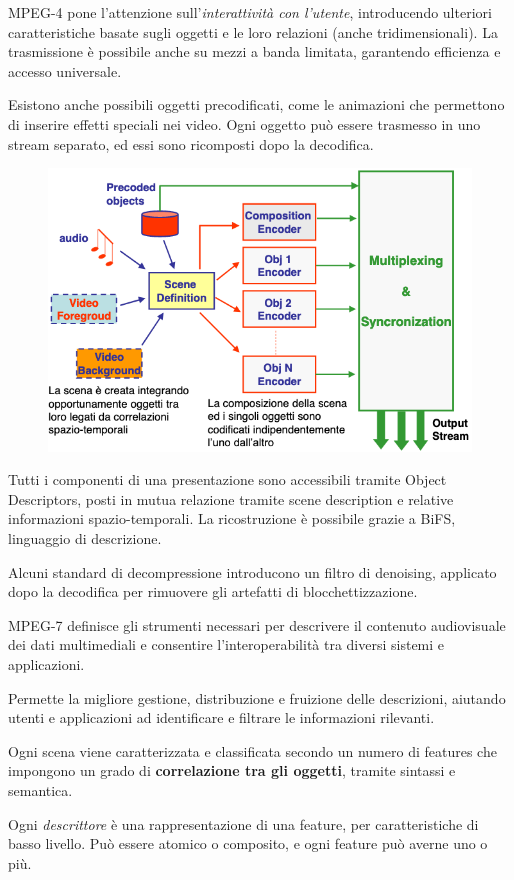 MPEG-4 pone l'attenzione sull'\textit{interattività con l'utente}, introducendo ulteriori caratteristiche basate sugli oggetti e le loro relazioni (anche tridimensionali). La trasmissione è possibile anche su mezzi a banda limitata, garantendo efficienza e accesso universale.

Esistono anche possibili oggetti precodificati, come le animazioni che permettono di inserire effetti speciali nei video. Ogni oggetto può essere trasmesso in uno stream separato, ed essi sono ricomposti dopo la decodifica.

\begin{figure}[h]
	\centering
	\includegraphics[scale=0.6]{Lezioni/Immagini/mpeg-4}
\end{figure}

Tutti i componenti di una presentazione sono accessibili tramite Object Descriptors, posti in mutua relazione tramite scene description e relative informazioni spazio-temporali. La ricostruzione è possibile grazie a BiFS, linguaggio di descrizione.

Alcuni standard di decompressione introducono un filtro di denoising, applicato dopo la decodifica per rimuovere gli artefatti di blocchettizzazione. 

MPEG-7 definisce gli strumenti necessari per descrivere il contenuto audiovisuale dei dati multimediali e consentire l'interoperabilità tra diversi sistemi e applicazioni. 

Permette la migliore gestione, distribuzione e fruizione delle descrizioni, aiutando utenti e applicazioni ad identificare e filtrare le informazioni rilevanti.

Ogni scena viene caratterizzata e classificata secondo un numero di features che impongono un grado di \textbf{correlazione tra gli oggetti}, tramite sintassi e semantica.

Ogni \textit{descrittore} è una rappresentazione di una feature, per caratteristiche di basso livello. Può essere atomico o composito, e ogni feature può averne uno o più.
